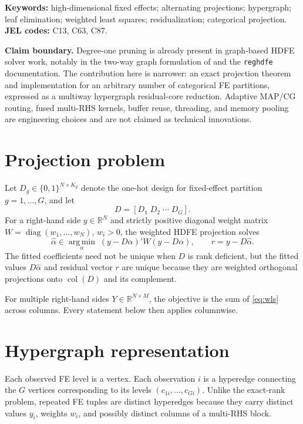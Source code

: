 \documentclass[11pt]{article}
\theoremstyle{definition}
\newcommand{\R}{\mathbb{R}}
\newcommand{\col}{\operatorname{col}}
\newcommand{\diag}{\operatorname{diag}}
\newcommand{\argmin}{\operatorname*{arg\,min}}
\newcommand{\1}{\mathbf{1}}
\begin{document}
\noindent\textbf{Keywords:} high-dimensional fixed effects; alternating projections; hypergraph; leaf elimination; weighted least squares; residualization; categorical projection.\\
\textbf{JEL codes:} C13, C63, C87.

\vspace{0.5em}
\noindent\textbf{Claim boundary.} Degree-one pruning is already present in graph-based HDFE solver work, notably in the two-way graph formulation of \citet{Correia2017} and the \texttt{reghdfe} documentation. The contribution here is narrower: an exact projection theorem and implementation for an arbitrary number of categorical FE partitions, expressed as a multiway hypergraph residual-core reduction. Adaptive MAP/CG routing, fused multi-RHS kernels, buffer reuse, threading, and memory pooling are engineering choices and are not claimed as technical innovations.

\section{Projection problem}

Let $D_g\in\{0,1\}^{N\times K_g}$ denote the one-hot design for fixed-effect partition $g=1,\dots,G$, and let
\[
  D=[D_1\;D_2\;\cdots\;D_G].
\]
For a right-hand side $y\in\R^N$ and strictly positive diagonal weight matrix $W=\diag(w_1,\dots,w_N)$, $w_i>0$, the weighted HDFE projection solves
\begin{equation}
  \widehat\alpha\in\argmin_{\alpha}\;(y-D\alpha)'W(y-D\alpha),
  \qquad r=y-D\widehat\alpha.
  \label{eq:wls}
\end{equation}
The fitted coefficients need not be unique when $D$ is rank deficient, but the fitted values $D\widehat\alpha$ and residual vector $r$ are unique because they are weighted orthogonal projections onto $\col(D)$ and its complement.

For multiple right-hand sides $Y\in\R^{N\times M}$, the objective is the sum of \eqref{eq:wls} across columns. Every statement below then applies columnwise.

\section{Hypergraph representation}

Each observed FE level is a vertex. Each observation $i$ is a hyperedge connecting the $G$ vertices corresponding to its levels $(c_{1i},\dots,c_{Gi})$. Unlike the exact-rank problem, repeated FE tuples are distinct hyperedges because they carry distinct values $y_i$, weights $w_i$, and possibly distinct columns of a multi-RHS block.
\end{document}
